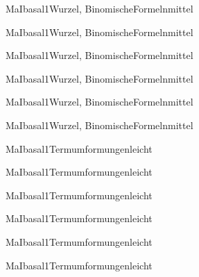 \documentclass[12pt]{article}
\begin{document}
    \begin{Add}{MaI}{basal1}{Wurzel, BinomischeFormeln}{mittel}
    \solution{ }
    \end{Add}
    \begin{Add}{MaI}{basal1}{Wurzel, BinomischeFormeln}{mittel}
    \end{Add}
    

    \begin{Add}{MaI}{basal1}{Wurzel, BinomischeFormeln}{mittel}
    \solution{ }
    \end{Add}
    \begin{Add}{MaI}{basal1}{Wurzel, BinomischeFormeln}{mittel}
    \end{Add}
    

    \begin{Add}{MaI}{basal1}{Wurzel, BinomischeFormeln}{mittel}
    \solution{ }
    \end{Add}
    \begin{Add}{MaI}{basal1}{Wurzel, BinomischeFormeln}{mittel}
    \end{Add}
    

    \begin{Add}{MaI}{basal1}{Termumformungen}{leicht}
    \solution{ }
    \end{Add}
    \begin{Add}{MaI}{basal1}{Termumformungen}{leicht}
    \end{Add}
    

    \begin{Add}{MaI}{basal1}{Termumformungen}{leicht}
    \solution{ }
    \end{Add}
    \begin{Add}{MaI}{basal1}{Termumformungen}{leicht}
    \end{Add}
    

    \begin{Add}{MaI}{basal1}{Termumformungen}{leicht}
    \solution{ }
    \end{Add}
    \begin{Add}{MaI}{basal1}{Termumformungen}{leicht}
    \end{Add}
    
\end{document}

